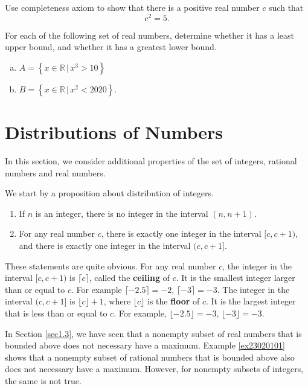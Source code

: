 \atc
 \begin{question}{\themyquestion}
 Use completeness axiom to show that there is a positive real number $c$ such that 
\[c^2=5.\]
\end{question}
\atc
 \begin{question}{\themyquestion}
For each of the following set of real numbers, determine whether it has a least upper bound, and whether it has a greatest lower bound.  
\begin{enumerate}[(a)]
\item $A=\left\{x\in\mathbb{R}\,|\, x^3>10\right\}$
\item $B=\left\{x\in\mathbb{R}\,|\, x^2<2020\right\}$.
\end{enumerate}
\end{question}

\vp
\section{Distributions of Numbers }\label{sec1.4}
In this section, we consider additional properties of the set of integers, rational numbers and real numbers.

We start by a proposition about distribution of integers.
\begin{proposition}
{}
\begin{enumerate}[1.]
\item If $n$ is an integer, there is no integer in the interval $(n, n+1)$.
\item For any real number $c$, there is exactly one integer in the interval $[c, c+1)$, and there is exactly one integer in the interval $(c, c+1]$.

\end{enumerate}
\end{proposition}
These statements are quite obvious. For any real number $c$, the integer in the interval $[c, c+1)$ is  $\lceil c\rceil$, called the {\bf ceiling} of $c$. It is the smallest integer larger than or equal to $c$. For example $\lceil -2.5\rceil=-2$, $\lceil -3\rceil =-3$. The integer in the interval $(c, c+1]$ is $\lfloor c\rfloor+1$, where $\lfloor c\rfloor$ is the {\bf floor} of $c$.  It is the largest integer that is less than or equal to $c$. For example, $\lfloor -2.5\rfloor =-3$, $\lfloor -3\rfloor =-3$.

In Section \ref{sec1.3}, we have seen that a nonempty subset of real numbers that is bounded above does not necessary have a maximum. Example \ref{ex23020101} shows that a nonempty  subset of rational numbers that is bounded above also does not necessary have a maximum. However, for nonempty  subsets of integers, the same is not true.

